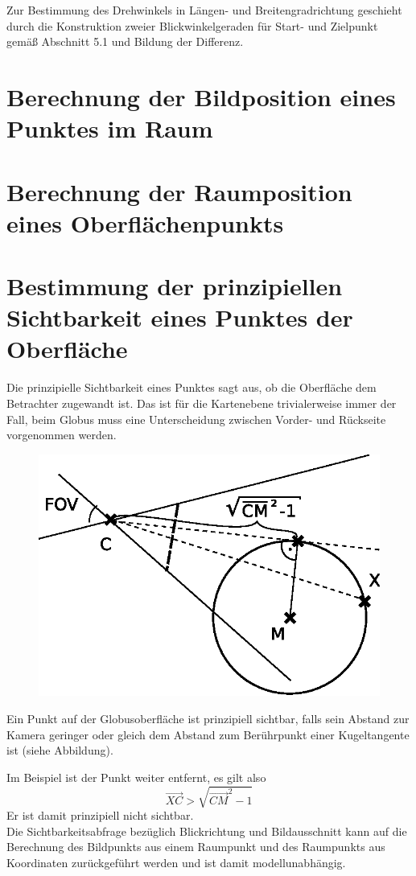 \documentclass[10pt]{scrreprt}
\begin{document}
Zur Bestimmung des Drehwinkels in Längen- und Breitengradrichtung geschieht durch die Konstruktion zweier Blickwinkelgeraden für Start- und Zielpunkt gemäß Abschnitt 5.1 und Bildung der Differenz.

\section{Berechnung der Bildposition eines Punktes im Raum}

\section{Berechnung der Raumposition eines Oberflächenpunkts}

\section{Bestimmung der prinzipiellen Sichtbarkeit eines Punktes der Oberfläche}
Die prinzipielle Sichtbarkeit eines Punktes sagt aus, ob die Oberfläche dem Betrachter zugewandt ist. Das ist für die Kartenebene trivialerweise immer der Fall, beim Globus muss eine Unterscheidung zwischen Vorder- und Rückseite vorgenommen werden.\\
\begin{figure}
\flushright
\includegraphics[scale=0.75]{algo/SichtbarKugel.eps}
\end{figure}
Ein Punkt auf der Globusoberfläche ist prinzipiell sichtbar, falls sein Abstand zur Kamera geringer oder gleich dem Abstand zum Berührpunkt einer Kugeltangente ist (siehe Abbildung). 

Im Beispiel ist der Punkt weiter entfernt, es gilt also 
\[\vec{XC} > \sqrt{\vec{CM}^2-1}\]
Er ist damit prinzipiell nicht sichtbar.\\[5mm]
Die Sichtbarkeitsabfrage bezüglich Blickrichtung und Bildausschnitt kann auf die Berechnung des Bildpunkts aus einem Raumpunkt und des Raumpunkts aus Koordinaten zurückgeführt werden und ist damit modellunabhängig.\\
\end{document}

